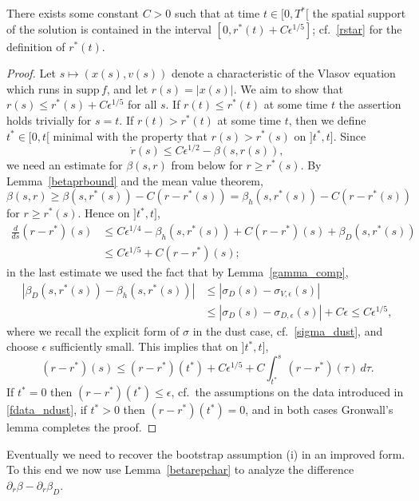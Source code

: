 \documentclass[11pt]{article}
\def\supp{\mathrm{supp}\,}
\begin{document}
\begin{lemma}\label{rsuppest}
  There exists some constant $C>0$ such that
  at time $t\in [0,T^\ast[$ the spatial
  support of the solution is contained in the interval
  $[0,r^\ast(t) + C\epsilon^{1/5}]$; cf.~\eqref{rstar} for the definition of $r^\ast(t)$.
\end{lemma}
%
\begin{proof}
  Let $s \mapsto (x(s),v(s))$ denote a characteristic of
  the Vlasov equation which
  runs in $\supp f$, and let $r(s)=|x(s)|$. We aim to show that
  $r(s) \leq r^\ast(s) + C\epsilon^{1/5}$ for all $s$.
  If $r(t) \leq r^\ast(t)$ at some
  time $t$ the assertion holds trivially for $s=t$.
  If $r(t) > r^\ast(t)$ at some time $t$, then we define $t^\ast\in[0,t[$
  minimal with the property that $r(s) > r^\ast(s)$ on $]t^\ast,t]$.
  Since
  \[
  \dot r(s) \leq C \epsilon^{1/2} - \beta(s,r(s)),
  \]
  we need an estimate for $\beta(s,r)$ from below for $r\geq r^\ast(s)$. 
  By Lemma~\ref{betaprbound} and the mean value theorem,
  \[
  \beta(s,r) \geq \beta(s, r^\ast(s)) - C (r- r^\ast(s))
  = \beta_h(s, r^\ast(s)) - C (r- r^\ast(s))
  \]
  for  $r\geq r^\ast(s)$. Hence on $]t^\ast,t]$,
  \begin{align*}
    \frac{d}{ds} (r-r^\ast)(s)
    &
    \leq C \epsilon^{1/4} - \beta_h(s,r^\ast(s))
    + C (r- r^\ast)(s) + \beta_D(s,r^\ast(s))\\
    &
    \leq C \epsilon^{1/5} + C (r- r^\ast)(s);
  \end{align*}
  in the last estimate we used the fact that by Lemma~\ref{gamma_comp},
  \begin{align*}
    |\beta_D(s,r^\ast(s))-\beta_h(s, r^\ast(s))|
    &
    \leq |\sigma_D(s)-\sigma_{V,\epsilon}(s)|\\
    &
    \leq |\sigma_D(s)-\sigma_{D,\epsilon}(s)| + C \epsilon \leq C \epsilon^{1/5},
  \end{align*}
  where we recall the explicit form of $\sigma$ in the dust case,
  cf.~\eqref{sigma_dust},
  and choose $\epsilon$ sufficiently small. This implies that on $]t^\ast,t]$,
  \[
  (r-r^\ast)(s) \leq (r-r^\ast)(t^\ast)
  + C \epsilon^{1/5} + C \int_{t^\ast}^s (r- r^\ast)(\tau)\, d\tau.
  \]
  If $t^\ast=0$ then $(r-r^\ast)(t^\ast)\leq\epsilon$, cf.\ the assumptions
  on the data introduced in \eqref{fdata_ndust}, if
  $t^\ast>0$ then $(r-r^\ast)(t^\ast)=0$, and in both cases Gronwall's lemma
  completes the proof.
\end{proof}

Eventually we need to recover the bootstrap assumption (i) in an improved form.
To this end we now use Lemma~\ref{betarepchar} to analyze the difference
$\partial_r \beta - \partial_r\beta_D$.
\end{document}
